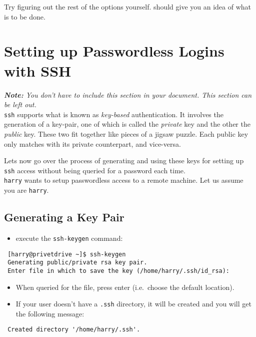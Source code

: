 \documentclass[a4paper,10pt,titlepage]{article}
\begin{document}
Try figuring out the rest of the options
yourself. \cite{wikibooks-listings} should give you an idea
of what is to be done.

\newpage
\section{Setting up Passwordless Logins with SSH}
\textit{\textbf{Note:} You don't have to include this section in your
document. This section can be left out.}\\


  \texttt{ssh} supports what is known as \emph{key-based} authentication. It
  involves the generation of a key-pair, one of which is called the
  \emph{private} key and the other the \emph{public} key. These two fit together
  like pieces of a jigsaw puzzle. Each public key only matches with
  its private counterpart, and vice-versa.

  Lets now go over the process of generating and using these keys for
  setting up \texttt{ssh} access without being queried for a password each
  time.\\

  \noindent \texttt{harry} wants to setup passwordless access to a remote machine. Let
  us assume you are \texttt{harry}.
\subsection{Generating a Key Pair}


\begin{itemize}
\item execute the \texttt{ssh-keygen} command:
\end{itemize}

\begin{verbatim}
 [harry@privetdrive ~]$ ssh-keygen
 Generating public/private rsa key pair.
 Enter file in which to save the key (/home/harry/.ssh/id_rsa):
\end{verbatim}

\begin{itemize}
\item When queried for the file, press enter (i.e.~choose the default
  location).
\item If your user doesn't have a \texttt{.ssh} directory, it will be created
    and you will get the following message:
\end{itemize}

\begin{verbatim}
 Created directory '/home/harry/.ssh'.
\end{verbatim}
\end{document}
